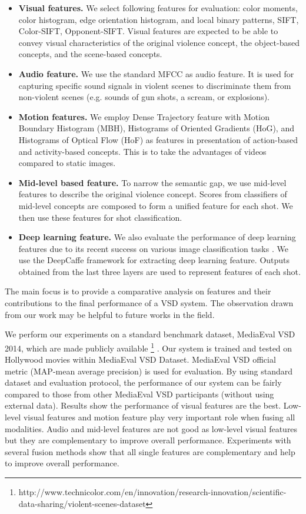\documentclass[twocolumn]{bmcart}%
\begin{document}
\begin{itemize}
	\item {\bf Visual features.} We select following features for evaluation: color moments, color histogram, edge orientation histogram, and local binary patterns, SIFT, Color-SIFT, Opponent-SIFT. Visual features are expected to be able to convey visual characteristics of the original violence concept, the object-based concepts, and the scene-based concepts.
	\item {\bf Audio feature.} We use the standard MFCC as audio feature. It is used for capturing specific sound signals in violent scenes to discriminate them from non-violent scenes (e.g. sounds of gun shots, a scream, or explosions). 
	\item {\bf Motion features.} We employ Dense Trajectory feature with Motion Boundary Histogram (MBH), Histograms of Oriented Gradients (HoG), and Histograms of Optical Flow (HoF) as features in presentation of action-based and activity-based concepts. This is to take the advantages of videos compared to static images.  
	\item {\bf Mid-level based feature.} To narrow the semantic gap, we use mid-level features to describe the original violence concept. Scores from classifiers of mid-level concepts are composed to form a unified feature for each shot. We then use these features for shot classification.
	\item {\bf Deep learning feature.} We also evaluate the performance of deep learning features due to its recent success on various image classification tasks \cite{krizhevsky2012imagenet}. We use the DeepCaffe framework for extracting deep learning feature. Outputs obtained from the last three layers are used to represent features of each shot. 
\end{itemize}
The main focus is to provide a comparative analysis on features and their contributions to the final performance of a VSD system. The observation drawn from our work may be helpful to future works in the field.

We perform our experiments on a standard benchmark dataset, MediaEval VSD 2014\cite{demarty2014benchmarking}, which are made publicly available \footnote{http://www.technicolor.com/en/innovation/research-innovation/scientific-data-sharing/violent-scenes-dataset} . Our system is trained and tested on Hollywood movies within MediaEval VSD Dataset. MediaEval VSD official metric (MAP-mean average precision) is used for evaluation. By using standard dataset and evaluation protocol, the performance of our system can be fairly compared to those from other MediaEval VSD participants (without using external data). Results show the performance of visual features are the best. Low-level visual features and motion feature play very important role when fusing all modalities. Audio and mid-level features are not good as low-level visual features but they are complementary to improve overall performance. Experiments with several fusion methods show that all single features are complementary and help to improve overall performance.
\end{document}
